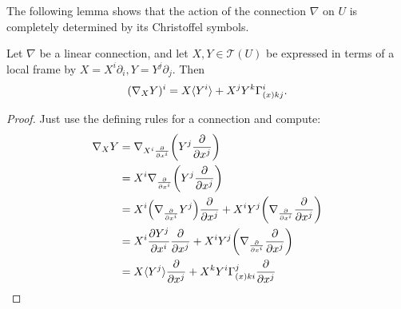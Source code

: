 \documentclass[12pt]{article} %
\begin{document}
The following lemma shows that the action of the connection $\nabla$ on $U$ is completely determined by its Christoffel symbols.
\begin{lema}\label{lem:donafadf}
Let $\nabla$ be a linear connection, and let $X, Y \in \mathcal{T}(U)$ be expressed in terms of a local frame by $X=X^{i} \partial_{i}, Y=Y^{j} \partial_{j}$. Then
\begin{align*} 
    (\nabla_XY)^i = X\langle Y^i\rangle + X^jY^k \Gamma^i_{(x)kj}.
\end{align*} 
\end{lema} 
\begin{proof}Just use the defining rules for a connection and compute:
\begin{align*} 
    \begin{split}
        \nabla_XY & = \nabla_{X^i\frac{\partial}{\partial x^i}}\bigg(Y^j\frac{\partial}{\partial x^j}\bigg) \\
        & = X^i \nabla_{\frac{\partial}{\partial x^i}} \bigg(Y^j\frac{\partial}{\partial x^j}\bigg) \\
        & = X^i \Big(\nabla_{\frac{\partial}{\partial x^i}}Y^j\Big) \frac{\partial}{\partial x^j} + X^i Y^j \bigg(\nabla_{\frac{\partial}{\partial x^i}}\frac{\partial}{\partial x^j}\bigg) \\
        & = X^i \frac{\partial Y^j}{\partial x^i} \frac{\partial}{\partial x^j} + X^iY^j \bigg(\nabla_{\frac{\partial}{\partial x^i}}\frac{\partial}{\partial x^j}\bigg) \\
        & = X\langle Y^j\rangle \frac{\partial}{\partial x^j} + X^kY^i \Gamma^j_{(x)ki} \frac{\partial}{\partial x^j}
    \end{split}
\end{align*} 
\end{proof} 
\end{document}

